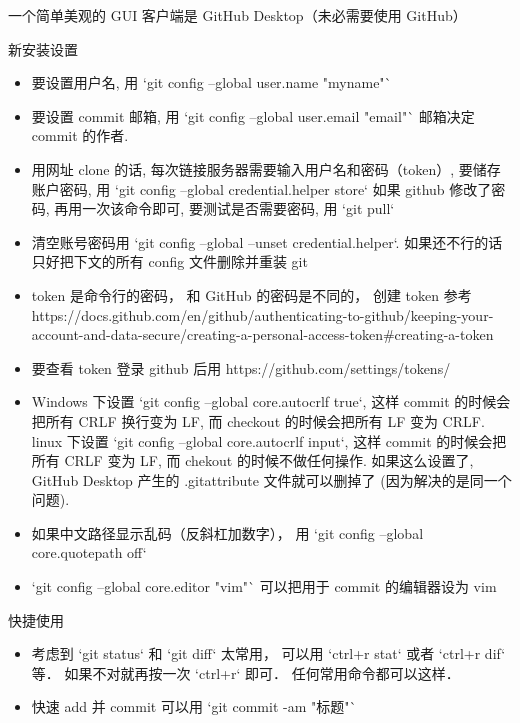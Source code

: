 

一个简单美观的 GUI 客户端是 GitHub Desktop（未必需要使用 GitHub）



新安装设置
\begin{itemize}
\item 要设置用户名, 用 `git config --global user.name "myname"`
\item 要设置 commit 邮箱, 用 `git config --global user.email "email"`  邮箱决定 commit 的作者.
\item 用网址 clone 的话, 每次链接服务器需要输入用户名和密码（token）, 要储存账户密码, 用 `git config --global credential.helper store` 如果 github 修改了密码, 再用一次该命令即可, 要测试是否需要密码, 用 `git pull`
\item 清空账号密码用 `git config --global --unset credential.helper`. 如果还不行的话只好把下文的所有 config 文件删除并重装 git
\item token 是命令行的密码， 和 GitHub 的密码是不同的， 创建 token 参考 https://docs.github.com/en/github/authenticating-to-github/keeping-your-account-and-data-secure/creating-a-personal-access-token#creating-a-token
\item 要查看 token 登录 github 后用 https://github.com/settings/tokens/
\item Windows 下设置 `git config --global core.autocrlf true`, 这样 commit 的时候会把所有 CRLF 换行变为 LF, 而 checkout 的时候会把所有 LF 变为 CRLF. linux 下设置 `git config --global core.autocrlf input`, 这样 commit 的时候会把所有 CRLF 变为 LF, 而 chekout 的时候不做任何操作. 如果这么设置了, GitHub Desktop 产生的 .gitattribute 文件就可以删掉了 (因为解决的是同一个问题).
\item 如果中文路径显示乱码（反斜杠加数字）， 用 `git config --global core.quotepath off`
\item `git config --global core.editor "vim"` 可以把用于 commit 的编辑器设为 vim
\end{itemize}

快捷使用
\begin{itemize}
\item 考虑到 `git status` 和 `git diff` 太常用， 可以用 `ctrl+r stat` 或者 `ctrl+r dif` 等． 如果不对就再按一次 `ctrl+r` 即可． 任何常用命令都可以这样．
\item 快速 add 并 commit 可以用 `git commit -am "标题"`
\end{itemize}

